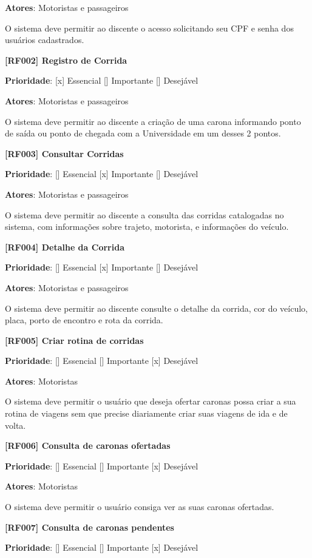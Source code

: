\textbf{Atores}: Motoristas e passageiros


O sistema deve permitir ao discente o acesso solicitando seu CPF e senha dos usuários cadastrados.

\textbf{[RF002] Registro de Corrida}

\textbf{Prioridade}:      [x] Essencial        [] Importante     [] Desejável 

\textbf{Atores}: Motoristas e passageiros

O sistema deve permitir ao discente a criação de uma carona informando ponto de saída ou ponto de chegada com a Universidade em um desses 2 pontos.

\textbf{[RF003] Consultar Corridas}

\textbf{Prioridade}:      [] Essencial        [x] Importante     [] Desejável 

\textbf{Atores}: Motoristas e passageiros

O sistema deve permitir ao discente a consulta das corridas catalogadas no sistema, com informações sobre trajeto, motorista, e informações do veículo.

\textbf{[RF004] Detalhe da Corrida}

\textbf{Prioridade}:      [] Essencial        [x] Importante     [] Desejável 

\textbf{Atores}: Motoristas e passageiros

O sistema deve permitir ao discente consulte o detalhe da corrida, cor do veículo, placa, porto de encontro e rota da corrida.

\textbf{[RF005] Criar rotina de corridas}

\textbf{Prioridade}:      [] Essencial        [] Importante     [x] Desejável 

\textbf{Atores}: Motoristas

O sistema deve permitir o usuário que deseja ofertar caronas possa criar a sua rotina de viagens sem que precise diariamente criar suas viagens de ida e de volta.


\textbf{[RF006] Consulta de caronas ofertadas}

\textbf{Prioridade}:      [] Essencial        [] Importante     [x] Desejável 

\textbf{Atores}: Motoristas

O sistema deve permitir o usuário consiga ver as suas caronas ofertadas.


\textbf{[RF007] Consulta de caronas pendentes}

\textbf{Prioridade}:      [] Essencial        [] Importante     [x] Desejável 

